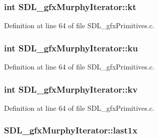 \subsubsection[{kt}]{\setlength{\rightskip}{0pt plus 5cm}int S\+D\+L\+\_\+gfx\+Murphy\+Iterator\+::kt}\label{struct_s_d_l__gfx_murphy_iterator_a179e1295e8dd96400439a35326311558}


Definition at line 64 of file S\+D\+L\+\_\+gfx\+Primitives.\+c.

\hypertarget{struct_s_d_l__gfx_murphy_iterator_aa65c5ae81743295d487bfc5881df042a}{}
\subsubsection[{ku}]{\setlength{\rightskip}{0pt plus 5cm}int S\+D\+L\+\_\+gfx\+Murphy\+Iterator\+::ku}\label{struct_s_d_l__gfx_murphy_iterator_aa65c5ae81743295d487bfc5881df042a}


Definition at line 64 of file S\+D\+L\+\_\+gfx\+Primitives.\+c.

\hypertarget{struct_s_d_l__gfx_murphy_iterator_a04191da7cf85bbdf1d6b05460b942837}{}
\subsubsection[{kv}]{\setlength{\rightskip}{0pt plus 5cm}int S\+D\+L\+\_\+gfx\+Murphy\+Iterator\+::kv}\label{struct_s_d_l__gfx_murphy_iterator_a04191da7cf85bbdf1d6b05460b942837}


Definition at line 64 of file S\+D\+L\+\_\+gfx\+Primitives.\+c.

\hypertarget{struct_s_d_l__gfx_murphy_iterator_af055b4e2bb24717935fdbe77495d4737}{}
\subsubsection[{last1x}]{ S\+D\+L\+\_\+gfx\+Murphy\+Iterator\+::last1x}\label{struct_s_d_l__gfx_murphy_iterator_af055b4e2bb24717935fdbe77495d4737}


